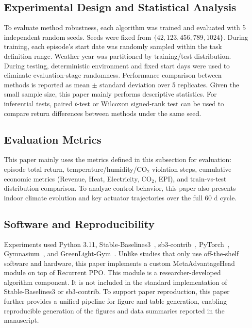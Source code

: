 \documentclass[number,preprint,review,12pt]{elsarticle}
\begin{document}
\subsection{Experimental Design and Statistical Analysis}
To evaluate method robustness, each algorithm was trained and evaluated with 5 independent random seeds. Seeds were fixed from $\{42, 123, 456, 789, 1024\}$. During training, each episode's start date was randomly sampled within the task definition range. Weather year was partitioned by training/test distribution. During testing, deterministic environment and fixed start days were used to eliminate evaluation-stage randomness. Performance comparison between methods is reported as mean $\pm$ standard deviation over 5 replicates. Given the small sample size, this paper mainly performs descriptive statistics. For inferential tests, paired $t$-test or Wilcoxon signed-rank test can be used to compare return differences between methods under the same seed.

\subsection{Evaluation Metrics}
This paper mainly uses the metrics defined in this subsection for evaluation: episode total return, temperature/humidity/CO$_2$ violation steps, cumulative economic metrics (Revenue, Heat, Electricity, CO$_2$, EPI), and train-vs-test distribution comparison. To analyze control behavior, this paper also presents indoor climate evolution and key actuator trajectories over the full 60 d cycle.

\subsection{Software and Reproducibility}
Experiments used Python 3.11, Stable-Baselines3~\cite{raffin2021sb3,sb3}, sb3-contrib~\cite{recurrentppo}, PyTorch~\cite{paszke2019pytorch}, Gymnasium~\cite{taksen2024gymnasium}, and GreenLight-Gym~\cite{van2025greenlight}. Unlike studies that only use off-the-shelf software and hardware, this paper implements a custom MetaAdvantageHead module on top of Recurrent PPO. This module is a researcher-developed algorithm component. It is not included in the standard implementation of Stable-Baselines3 or sb3-contrib. To support paper reproduction, this paper further provides a unified pipeline for figure and table generation, enabling reproducible generation of the figures and data summaries reported in the manuscript.
\end{document}

